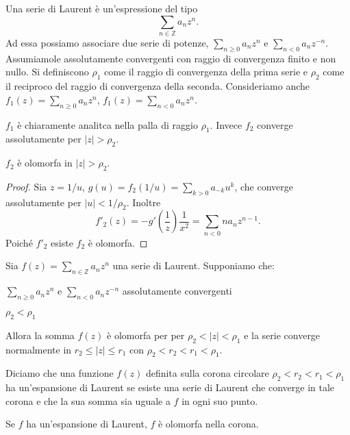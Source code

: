 \begin{defn}
    Una serie di Laurent \`e un'espressione del tipo
    \[
        \sum_{n\in \mathbb{Z}}a_n z^n.
    \]
    Ad essa possiamo associare due serie di potenze, $\sum_{n\geq 0}a_n z^n$ e
    $\sum_{n< 0}a_n z^{-n}$. Assumiamole assolutamente convergenti con raggio di
    convergenza finito e non nullo.
    Si definiscono $\rho_1$ come il raggio di convergenza della prima serie e
    $\rho_2$ come il reciproco del raggio di convergenza della seconda.
    Consideriamo anche $f_1(z)=\sum_{n\geq 0}a_n z^n$, $f_1(z)=\sum_{n< 0}a_n
    z^n$.
\end{defn}
$f_1$ \`e chiaramente analitca nella palla di raggio $\rho_1$. Invece $f_2$
converge assolutamente per $|z|>\rho_2$.

\begin{prop} $f_2$ \`e olomorfa in $|z|>\rho_2$.
\end{prop}
\begin{proof}
    Sia $z=1/u$, $g(u) = f_2(1/u) = \sum_{k>0}a_{-k}u^k$, che converge
    assolutamente per $|u|<1/\rho_2$. Inoltre 
    \[
        f'_2(z) = -g'(\frac{1}{z})\frac{1}{x^2} = \sum_{n<0}na_nz^{n-1}.
    \]
    Poich\'e $f'_2$ esiste $f_2$ \`e olomorfa.
\end{proof}

\begin{prop}
    Sia $f(z)=\sum_{n\in\mathbb{Z}}a_nz^n$ una serie di Laurent. Supponiamo che:
    \begin{nlist}
        \item $\sum_{n\geq 0}a_nz^n$ e $\sum_{n<0}a_nz^{-n}$ assolutamente
            convergenti
        \item $\rho_2<\rho_1$
    \end{nlist}
    Allora la somma $f(z)$ \`e olomorfa per per $\rho_2<|z|<\rho_1$ e la serie
    converge normalmente in $r_2\leq |z| \leq r_1$ con $\rho_2<r_2<r_1<\rho_1$.
\end{prop}

\begin{defn}
    Diciamo che una funzione $f(z)$ definita sulla corona circolare
    $\rho_2<r_2<r_1<\rho_1$ ha un'espansione di Laurent se esiste una serie di
    Laurent che converge in tale corona e che la sua somma sia uguale a $f$ in
    ogni suo punto.
\end{defn}

\begin{oss}    
    Se $f$ ha un'espansione di Laurent, $f$ \`e olomorfa nella corona.
\end{oss}    

